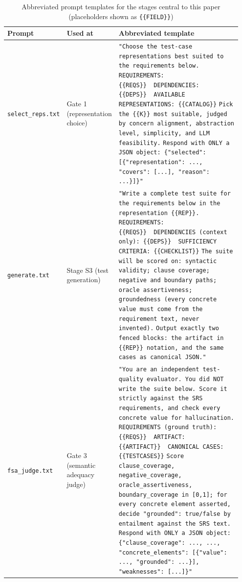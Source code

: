 \documentclass[conference]{IEEEtran}
\begin{document}
\begin{table}[t]
\centering
\caption{Abbreviated prompt templates for the stages central to this paper (placeholders shown as \texttt{\{\{FIELD\}\}})}
\label{tab:prompts}
\small
\begin{tabular}{@{}p{0.17\linewidth}p{0.17\linewidth}p{0.61\linewidth}@{}}
\toprule
\textbf{Prompt} & \textbf{Used at} & \textbf{Abbreviated template} \\
\midrule
\texttt{select\_reps.txt} & Gate 1 (representation choice) &
\texttt{"Choose the test-case representations best suited to the requirements below.} \newline
\texttt{REQUIREMENTS: \{\{REQS\}\}\ \ DEPENDENCIES: \{\{DEPS\}\}\ \ AVAILABLE REPRESENTATIONS: \{\{CATALOG\}\}} \newline
\texttt{Pick the \{\{K\}\} most suitable, judged by concern alignment, abstraction level, simplicity, and LLM feasibility.} \newline
\texttt{Respond with ONLY a JSON object: \{"selected": [\{"representation": ..., "covers": [...], "reason": ...\}]\}"} \\
\addlinespace
\texttt{generate.txt} & Stage S3 (test generation) &
\texttt{"Write a complete test suite for the requirements below in the representation \{\{REP\}\}.} \newline
\texttt{REQUIREMENTS: \{\{REQS\}\}\ \ DEPENDENCIES (context only): \{\{DEPS\}\}\ \ SUFFICIENCY CRITERIA: \{\{CHECKLIST\}\}} \newline
\texttt{The suite will be scored on: syntactic validity; clause coverage; negative and boundary paths; oracle assertiveness; groundedness (every concrete value must come from the requirement text, never invented).} \newline
\texttt{Output exactly two fenced blocks: the artifact in \{\{REP\}\} notation, and the same cases as canonical JSON."} \\
\addlinespace
\texttt{fsa\_judge.txt} & Gate 3 (semantic adequacy judge) &
\texttt{"You are an independent test-quality evaluator. You did NOT write the suite below. Score it strictly against the SRS requirements, and check every concrete value for hallucination.} \newline
\texttt{REQUIREMENTS (ground truth): \{\{REQS\}\}\ \ ARTIFACT: \{\{ARTIFACT\}\}\ \ CANONICAL CASES: \{\{TESTCASES\}\}} \newline
\texttt{Score clause\_coverage, negative\_coverage, oracle\_assertiveness, boundary\_coverage in [0,1]; for every concrete element asserted, decide "grounded": true/false by entailment against the SRS text.} \newline
\texttt{Respond with ONLY a JSON object: \{"clause\_coverage": ..., ..., "concrete\_elements": [\{"value": ..., "grounded": ...\}], "weaknesses": [...]\}"} \\
\bottomrule
\end{tabular}
\end{table}
\end{document}
